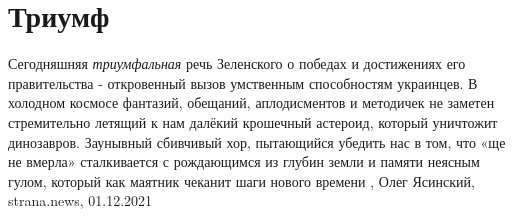  
 
 
 
 
\chapter{Триумф}
\label{sec:slova.triumf}

Сегодняшняя \emph{триумфальная} речь Зеленского о победах и достижениях его
правительства - откровенный вызов умственным способностям украинцев. В холодном
космосе фантазий, обещаний, аплодисментов и методичек не заметен стремительно
летящий к нам далёкий крошечный астероид, который уничтожит динозавров.
Заунывный сбивчивый хор, пытающийся убедить нас в том, что «ще не вмерла»
сталкивается с рождающимся из глубин земли и памяти неясным гулом, который как
маятник чеканит шаги нового времени
, 
Олег Ясинский, strana.news, 01.12.2021
